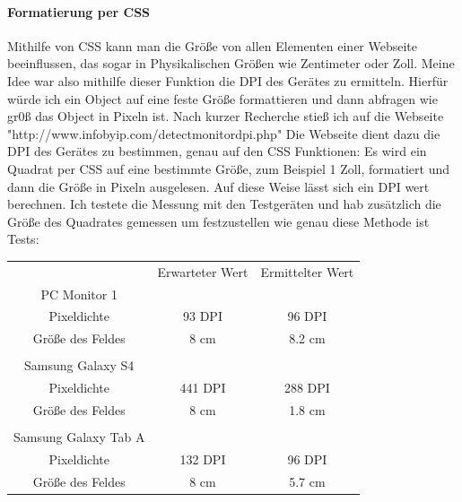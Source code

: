 \paragraph{Formatierung per CSS} 
Mithilfe von CSS kann man die Größe von allen Elementen einer Webseite beeinflussen, das sogar in Physikalischen Größen wie Zentimeter oder Zoll. Meine Idee war also mithilfe dieser Funktion die DPI des Gerätes zu ermitteln.
\newline
Hierfür würde ich ein Object auf eine feste Größe formattieren und dann abfragen wie gr0ß das Object in Pixeln ist.
\newline
\newline
Nach kurzer Recherche stieß ich auf die Webseite "http://www.infobyip.com/detectmonitordpi.php"
\newline
Die Webseite dient dazu die DPI des Gerätes zu bestimmen, genau auf den CSS Funktionen: Es wird ein Quadrat per CSS auf eine bestimmte Größe, zum Beispiel 1 Zoll, formatiert und dann die Größe in Pixeln ausgelesen. Auf diese Weise lässt sich ein DPI wert berechnen.
\newline
Ich testete die Messung mit den Testgeräten und hab zusätzlich die Größe des Quadrates gemessen um festzustellen wie genau diese Methode ist
\newline
	      \newline
	      Tests:
	      \newline
	      \begin{tabular}{ccc}
	      	                     & Erwarteter Wert & Ermittelter Wert           \\
	      	PC Monitor 1         &                 &                            \\
	      	Pixeldichte          & 93 DPI          & \colorbox{red!30}{96 DPI}  \\
	      	Größe des Feldes     & 8 cm            & \colorbox{red!30}{8.2 cm}  \\
	      	                     &                 &                            \\
	      	Samsung Galaxy S4    &                 &                            \\
	      	Pixeldichte          & 441 DPI         & \colorbox{red!30}{288 DPI} \\
	      	Größe des Feldes     & 8 cm            & \colorbox{red!30}{1.8 cm}  \\
	      	                     &                 &                            \\
	      	Samsung Galaxy Tab A &                 &                            \\
	      	Pixeldichte          & 132 DPI         & \colorbox{red!30}{96 DPI}  \\
	      	Größe des Feldes     & 8 cm            & \colorbox{red!30}{5.7 cm}  \\
	      \end{tabular}

